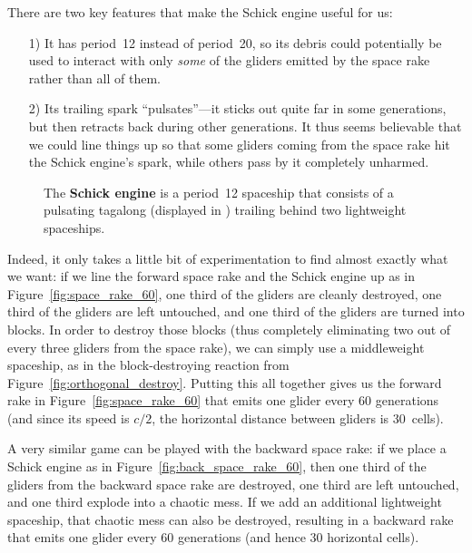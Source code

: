There are two key features that make the Schick engine useful for us:\smallskip

\begin{enumerate}
	\item[1)] It has period~12 instead of period~20, so its debris could potentially be used to interact with only \emph{some} of the gliders emitted by the space rake rather than all of them.\smallskip
	
	\item[2)] Its trailing spark ``pulsates''---it sticks out quite far in some generations, but then retracts back during other generations. It thus seems believable that we could line things up so that some gliders coming from the space rake hit the Schick engine's spark, while others pass by it completely unharmed.\smallskip
\end{enumerate}

\begin{figure}[!htb]
	\centering{}
	\caption{The \textbf{Schick engine} is a period~12 spaceship that consists of a pulsating tagalong (displayed in ) trailing behind two lightweight spaceships.}\label{fig:schick_engine}
\end{figure}

Indeed, it only takes a little bit of experimentation to find almost exactly what we want: if we line the forward space rake and the Schick engine up as in Figure~\ref{fig:space_rake_60}, one third of the gliders are cleanly destroyed, one third of the gliders are left untouched, and one third of the gliders are turned into blocks. In order to destroy those blocks (thus completely eliminating two out of every three gliders from the space rake), we can simply use a middleweight spaceship, as in the block-destroying reaction from Figure~\ref{fig:orthogonal_destroy}. Putting this all together gives us the forward rake in Figure~\ref{fig:space_rake_60} that emits one glider every 60 generations (and since its speed is $c/2$, the horizontal distance between gliders is 30~cells).

A very similar game can be played with the backward space rake: if we place a Schick engine as in Figure~\ref{fig:back_space_rake_60}, then one third of the gliders from the backward space rake are destroyed, one third are left untouched, and one third explode into a chaotic mess. If we add an additional lightweight spaceship, that chaotic mess can also be destroyed, resulting in a backward rake that emits one glider every 60 generations (and hence 30 horizontal cells).

